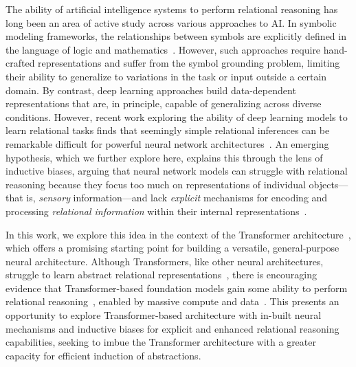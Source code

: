 The ability of artificial intelligence systems to perform relational reasoning has long been an area of active study across various approaches to AI. In symbolic modeling frameworks, the relationships between symbols are explicitly defined in the language of logic and mathematics~\citep{newell1980physical,harnad1990symbol,fodor1988connectionism}. However, such approaches require hand-crafted representations and suffer from the symbol grounding problem, limiting their ability to generalize to variations in the task or input outside a certain domain. By contrast, deep learning approaches build data-dependent representations that are, in principle, capable of generalizing across diverse conditions. However, recent work exploring the ability of deep learning models to learn relational tasks finds that seemingly simple relational inferences can be remarkable difficult for powerful neural network architectures~\citep{lake2018generalization,barrett2018measuring,hill2018learning,webbEmergentSymbolsBinding2021,santoroSimpleNeuralNetwork2017,shanahanExplicitlyRelationalNeurala,kergNeuralArchitectureInductive2022,altabaa2024abstractors,altabaaLearningHierarchicalRelational2024}. An emerging hypothesis, which we further explore here, explains this through the lens of inductive biases, arguing that neural network models can struggle with relational reasoning because they focus too much on representations of individual objects---that is, \textit{sensory} information---and lack \textit{explicit} mechanisms for encoding and processing \textit{relational information} within their internal representations~\citep{webbRelationalBottleneckInductive2024}.

In this work, we explore this idea in the context of the Transformer architecture~\citep{vaswani2017attention}, which offers a promising starting point for building a versatile, general-purpose neural architecture. Although Transformers, like other neural architectures, struggle to learn abstract relational representations~\citep{santoroSimpleNeuralNetwork2017,shanahanExplicitlyRelationalNeurala,kergNeuralArchitectureInductive2022,altabaa2024abstractors,altabaaLearningHierarchicalRelational2024}, there is encouraging evidence that Transformer-based foundation models gain some ability to perform relational reasoning~\citep{wei2022chain,kojima2022large,valmeekam2022large,huang2023reasoninglargelanguagemodels,webb2023emergent,huang2024largelanguagemodelsselfcorrect,mirzadeh2024gsmsymbolicunderstandinglimitationsmathematical}, enabled by massive compute and data~\citep{brown2020languagemodelsfewshotlearners,kaplan2020scalinglawsneurallanguage,hoffmann2022trainingcomputeoptimallargelanguage,grattafiori2024llama3herdmodels}. This presents an opportunity to explore Transformer-based architecture with in-built neural mechanisms and inductive biases for explicit and enhanced relational reasoning capabilities, seeking to imbue the Transformer architecture with a greater capacity for efficient induction of abstractions.

